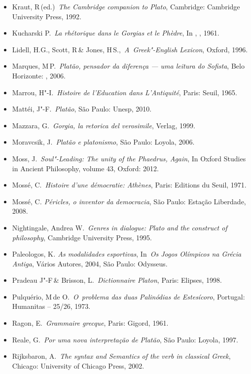 {\begin{itemize}
  1986.
\item
  Kraut, R\,(ed.)~\emph{The Cambridge companion to Plato}, Cambridge:
  Cambridge University Press, 1992.
\item
  Kucharski P.~\emph{La rhétorique dans le Gorgias et le Phèdre}, In
  , , 1961.
\item
  Lidell, H.G., Scott, R\,\& Jones, H\,S.,~\emph{A~Greek"-English
  Lexicon}, Oxford, 1996.
\item
  Marques, M\,P.~\emph{Platão, pensador da diferença --- uma leitura do
  Sofista}, Belo Horizonte: , 2006.
\item
  Marrou, H"-I.~\emph{Histoire de l'Education dans L'Antiquité}, Paris:
  Seuil, 1965.
\item
  Mattéi, J"-F.~\emph{Platão}, São Paulo: Unesp, 2010.
\item
  Mazzara, G.~\emph{Gorgia, la retorica del verosimile}, Verlag, 1999.
\item
  Moravcsik, J.~\emph{Platão e platonismo}, São Paulo: Loyola, 2006.
\item
  Moss, J.~\emph{Soul"-Leading: The unity of the Phaedrus, Again}, In
  Oxford Studies in Ancient Philosophy, volume 43, Oxford: 2012.
\item
  Mossé, C.~\emph{Histoire d'une démocratie: Athènes}, Paris: Editions
  du Seuil, 1971.
\item
  Mossé, C\emph{. Péricles, o inventor da democracia}, São Paulo:
  Estação Liberdade, 2008.
\item
  Nightingale, Andrea W.~\emph{Genres in dialogue: Plato and the
  construct of philosophy}, Cambridge University Press, 1995.
\item
  Paleologos, K\emph{. As modalidades esportivas}, In~\emph{Os Jogos
  Olímpicos na Grécia Antiga}, Vários Autores, 2004, São Paulo:
  Odysseus.
\item
  Pradeau J"-F\,\& Brisson, L.~\emph{Dictionnaire Platon}, Paris:
  Elipses, 1998.
\item
  Pulquério, M\,de O.~\emph{O~problema das duas Palinódias de
  Estesícoro}, Portugal: Humanitas -- 25/\allowbreak{}26, 1973.
\item
  Ragon, E.~\emph{Grammaire grecque}, Paris: Gigord, 1961.
\item
  Reale, G.~\emph{Por uma nova interpretação de Platão}, São Paulo:
  Loyola, 1997.
\item
  Rijksbaron, A.~\emph{The syntax and Semantics of the verb in classical
  Greek}, Chicago: University of Chicago Press, 2002.

\end{itemize}}
